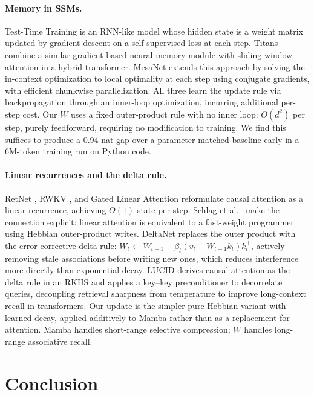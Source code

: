 \documentclass{article}
\begin{document}
\paragraph{Memory in SSMs.}
Test-Time Training \citep[TTT;][]{sun2024learning} is an RNN-like model whose hidden state is a weight matrix updated by gradient descent on a self-supervised loss at each step. Titans \citep{behrouz2024titans} combine a similar gradient-based neural memory module with sliding-window attention in a hybrid transformer. MesaNet \citep{von2025mesanet} extends this approach by solving the in-context optimization to local optimality at each step using conjugate gradients, with efficient chunkwise parallelization. All three learn the update rule via backpropagation through an inner-loop optimization, incurring additional per-step cost. Our $W$ uses a fixed outer-product rule with no inner loop: $O(d^2)$ per step, purely feedforward, requiring no modification to training. We find this suffices to produce a 0.94-nat gap over a parameter-matched baseline early in a 6M-token training run on Python code.

\paragraph{Linear recurrences and the delta rule.}
RetNet \citep{sun2023retentive}, RWKV \citep{peng2023rwkv}, and Gated Linear Attention \citep{yang2023gated} reformulate causal attention as a linear recurrence, achieving $O(1)$ state per step. Schlag et al.~\citep{schlag2021linear} make the connection explicit: linear attention is equivalent to a fast-weight programmer using Hebbian outer-product writes. DeltaNet \citep{yang2024deltanet} replaces the outer product with the error-corrective delta rule: $W_t \leftarrow W_{t-1} + \beta_t(v_t - W_{t-1}k_t)k_t^\top$, actively removing stale associations before writing new ones, which reduces interference more directly than exponential decay. LUCID \citep{duvvuri2026lucid} derives causal attention as the delta rule in an RKHS and applies a key--key preconditioner to decorrelate queries, decoupling retrieval sharpness from temperature to improve long-context recall in transformers. Our update is the simpler pure-Hebbian variant with learned decay, applied additively to Mamba rather than as a replacement for attention. Mamba handles short-range selective compression; $W$ handles long-range associative recall.

\section{Conclusion}
\end{document}
